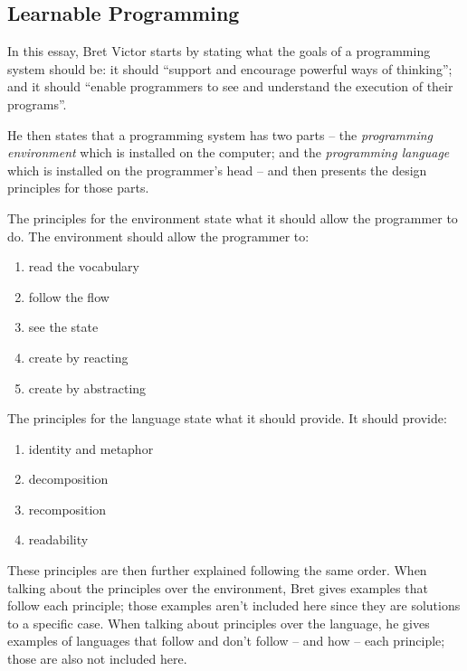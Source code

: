 \documentclass{./llncs2e/llncs}
\begin{document}
\subsection{Learnable Programming\cite{victor2012learnable}}
	In this essay, Bret Victor starts by stating what the goals of a programming system should be: it should ``support and encourage powerful ways of thinking''; and it should ``enable programmers to see and understand the execution of their programs''.

	He then states that a programming system has two parts -- the \emph{programming environment} which is installed on the computer; and the \emph{programming language} which is installed on the programmer's head -- and then presents the design principles for those parts.

	The principles for the environment state what it should allow the programmer to do. The environment should allow the programmer to:
	\begin{enumerate}
		\item \label{lp:env:read} read the vocabulary 
		\item \label{lp:env:flow} follow the flow
		\item \label{lp:env:state} see the state
		\item \label{lp:env:react} create by reacting
		\item \label{lp:env:abstr} create by abstracting
	\end{enumerate}

	The principles for the language state what it should provide. It should provide:
	\begin{enumerate}
		\item \label{lp:lang:id} identity and metaphor
		\item \label{lp:lang:decom} decomposition
		\item \label{lp:lang:recom} recomposition
		\item \label{lp:lang:read} readability
	\end{enumerate}

	These principles are then further explained following the same order. When talking about the principles over the environment, Bret gives examples that follow each principle; those examples aren't included here since they are solutions to a specific case. When talking about principles over the language, he gives examples of languages that follow and don't follow -- and how -- each principle; those are also not included here.
\end{document}
